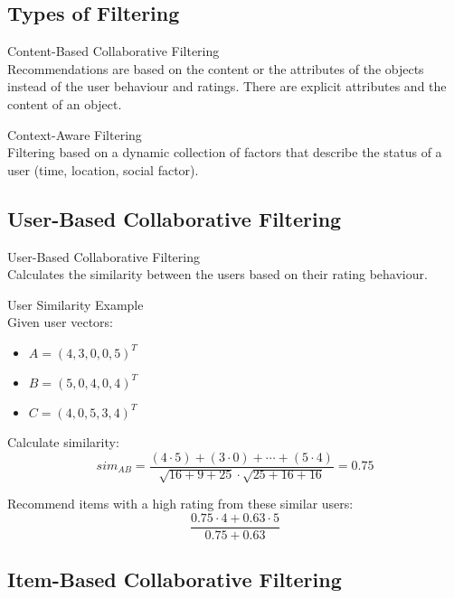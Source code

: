 \subsection{Types of Filtering}

\begin{definition}{Content-Based Collaborative Filtering}\\
Recommendations are based on the content or the attributes of the objects instead of the user behaviour and ratings. There are explicit attributes and the content of an object.
\end{definition}

\begin{definition}{Context-Aware Filtering}\\
Filtering based on a dynamic collection of factors that describe the status of a user (time, location, social factor).
\end{definition}

\subsection{User-Based Collaborative Filtering}

\begin{concept}{User-Based Collaborative Filtering}\\
Calculates the similarity between the users based on their rating behaviour.
\end{concept}

\begin{example2}{User Similarity Example}\\
Given user vectors:
\begin{itemize}
    \item $A = (4, 3, 0, 0, 5)^T$
    \item $B = (5, 0, 4, 0, 4)^T$
    \item $C = (4, 0, 5, 3, 4)^T$
\end{itemize}

Calculate similarity:
$$sim_{AB} = \frac{(4 \cdot 5) + (3 \cdot 0) + \cdots + (5 \cdot 4)}{\sqrt{16 + 9 + 25} \cdot \sqrt{25 + 16 + 16}} = 0.75$$

Recommend items with a high rating from these similar users:
$$\frac{0.75 \cdot 4 + 0.63 \cdot 5}{0.75 + 0.63}$$
\end{example2}


\subsection{Item-Based Collaborative Filtering}

